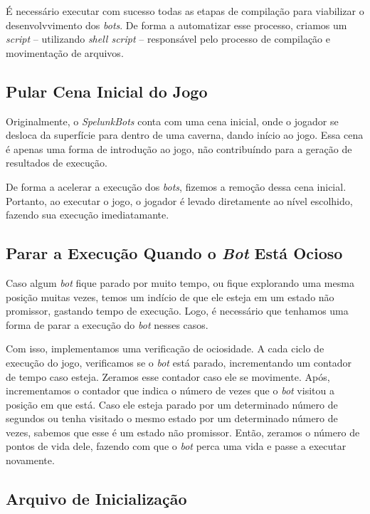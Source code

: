É necessário executar com sucesso todas as etapas de compilação para viabilizar
o desenvolvvimento dos \textit{bots}. De forma a automatizar esse processo,
criamos um \textit{script} -- utilizando \textit{shell script} -- responsável
pelo processo de compilação e movimentação de arquivos.

\subsection{Pular Cena Inicial do Jogo}

Originalmente, o \textit{SpelunkBots} conta com uma cena inicial, onde o
jogador se desloca da superfície para dentro de uma caverna, dando início ao
jogo. Essa cena é apenas uma forma de introdução ao jogo, não contribuíndo para
a geração de resultados de execução.

De forma a acelerar a execução dos \textit{bots}, fizemos a remoção dessa cena
inicial. Portanto, ao executar o jogo, o jogador é levado diretamente ao nível
escolhido, fazendo sua execução imediatamante.

\subsection{Parar a Execução Quando o \textit{Bot} Está Ocioso}


Caso algum \textit{bot} fique parado por muito tempo, ou fique explorando uma
mesma posição muitas vezes, temos um indício de que ele esteja em um estado não
promissor, gastando tempo de execução. Logo, é necessário que tenhamos uma
forma de parar a execução do \textit{bot} nesses casos.

Com isso, implementamos uma verificação de ociosidade. A cada ciclo de execução
do jogo, verificamos se o \textit{bot} está parado, incrementando um contador
de tempo caso esteja. Zeramos esse contador caso ele se movimente. Após,
incrementamos o contador que indica o número de vezes que o \textit{bot}
visitou a posição em que está. Caso ele esteja parado por um determinado número
de segundos ou tenha visitado o mesmo estado por um determinado número de
vezes, sabemos que esse é um estado não promissor. Então, zeramos o número de
pontos de vida dele, fazendo com que o \textit{bot} perca uma vida e passe a
executar novamente.

\subsection{Arquivo de Inicialização}

